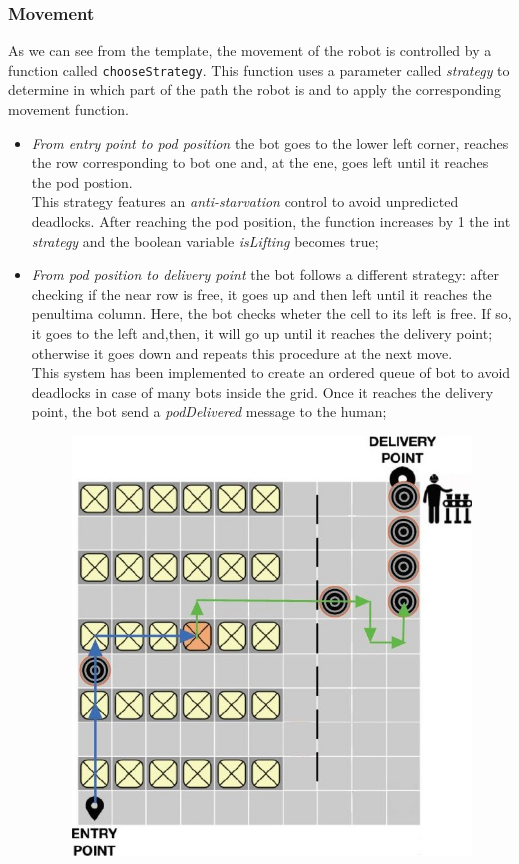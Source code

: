 \documentclass[10pt,a4paper]{article}
\begin{document}
			\subsubsection{Movement}
				As we can see from the template, the movement of the robot is controlled by a function called \verb|chooseStrategy|. This function uses a parameter called \emph{strategy} to determine in which part of the path the robot is and to apply the corresponding movement function.\\
				\begin{itemize}
					\item \emph{From entry point to pod position} the bot goes to the lower left corner, reaches the row corresponding to bot one and, at the ene, goes left until it reaches the pod postion.\\This strategy features an \emph{anti-starvation} control to avoid unpredicted deadlocks. After reaching the pod position, the function increases by 1 the int \emph{strategy} and the boolean variable \emph{isLifting} becomes true;
					\item \emph{From pod position to delivery point} the bot follows a different strategy: after checking if the near row is free, it goes up and then left until it reaches the penultima column. Here, the bot checks wheter the cell to its left is free. If so, it goes to the left and,then, it will go up until it reaches the delivery point; otherwise it goes down and repeats this procedure at the next move.\\This system has been implemented to create an ordered queue of bot to avoid deadlocks in case of many bots inside the grid. Once it reaches the delivery point, the bot send a \emph{podDelivered} message to the human;
					\begin{figure}[ht]
						\centering
						\includegraphics[scale = 0.36]{Images/BotMovement1.JPG}

\end{figure}
\end{itemize}
\end{document}
